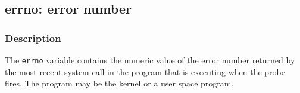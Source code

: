 \clearpage
{}
{}
\label{vars:errno}
\subsection*{errno: error number}

\subsubsection*{Description}

The \verb|errno| variable contains the numeric value of the error
number returned by the most recent system call in the program that is
executing when the probe fires.  The program may be the kernel or a
user space program.


